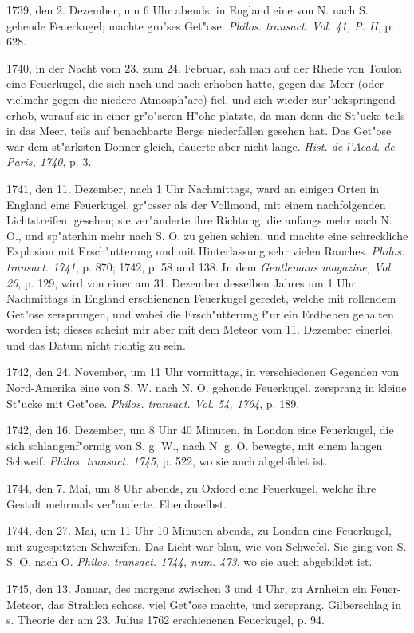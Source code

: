 \documentclass[a4paper, 11pt, oneside, polutonikogreek, german]{article}
\begin{document}
1739, den 2. Dezember, um 6 Uhr abends, in England eine von N. nach S. gehende Feuerkugel; machte gro"ses Get"ose. \emph{Philos. transact. Vol. 41, P. II}, p. 628.

1740, in der Nacht vom 23. zum 24. Februar, sah man auf der Rhede von Toulon eine Feuerkugel, die sich nach und nach erhoben hatte, gegen das Meer (oder vielmehr gegen die niedere Atmosph"are) fiel, und sich wieder zur"uckspringend erhob, worauf sie in einer gr"o"seren H"ohe platzte, da man denn die St"ucke teils in das Meer, teils auf benachbarte Berge niederfallen gesehen hat. Das Get"ose war dem st"arksten Donner gleich, dauerte aber nicht lange. \emph{Hist. de l'Acad. de Paris, 1740}, p. 3.

1741, den 11. Dezember, nach 1 Uhr Nachmittags, ward an einigen Orten in England eine Feuerkugel, gr"osser als der Vollmond, mit einem nachfolgenden Lichtstreifen, gesehen; sie ver"anderte ihre Richtung, die anfangs mehr nach N. O., und sp"aterhin mehr nach S. O. zu gehen schien, und machte eine schreckliche Explosion mit Ersch"utterung und mit Hinterlassung sehr vielen Rauches. \emph{Philos. transact. 1741}, p. 870; 1742, p. 58 und 138. In dem \emph{Gentlemans magazine, Vol. 20}, p. 129, wird von einer am 31. Dezember desselben Jahres um 1 Uhr Nachmittags in England erschienenen Feuerkugel geredet, welche mit rollendem Get"ose zersprungen, und wobei die Ersch"utterung f"ur ein Erdbeben gehalten worden ist; dieses scheint mir aber mit dem Meteor vom 11. Dezember einerlei, und das Datum nicht richtig zu sein.

1742, den 24. November, um 11 Uhr vormittags, in verschiedenen Gegenden von Nord-Amerika eine von S. W. nach N. O. gehende Feuerkugel, zersprang in kleine St"ucke mit Get"ose. \emph{Philos. transact. Vol. 54, 1764}, p. 189.

1742, den 16. Dezember, um 8 Uhr 40 Minuten, in London eine Feuerkugel, die sich schlangenf"ormig von S. g. W., nach N. g. O. bewegte, mit einem langen Schweif. \emph{Philos. transact. 1745}, p. 522, wo sie auch abgebildet ist.

1744, den 7. Mai, um 8 Uhr abends, zu Oxford eine Feuerkugel, welche ihre Gestalt mehrmals ver"anderte. Ebendaselbst.

1744, den 27. Mai, um 11 Uhr 10 Minuten abends, zu London eine Feuerkugel, mit zugespitzten Schweifen. Das Licht war blau, wie von Schwefel. Sie ging von S. S. O. nach O. \emph{Philos. transact. 1744, num. 473}, wo sie auch abgebildet ist.

1745, den 13. Januar, des morgens zwischen 3 und 4 Uhr, zu Arnheim ein Feuer-Meteor, das Strahlen schoss, viel Get"ose machte, und zersprang. Gilberschlag in s. Theorie der am 23. Julius 1762 erschienenen Feuerkugel, p. 94.
\end{document}
